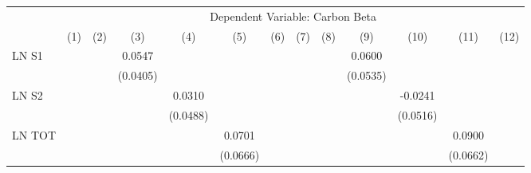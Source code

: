 {
\def\sym#1{\ifmmode^{#1}\else\(^{#1}\)\fi}
\begin{tabular}{l*{12}{c}}
\hline\hline
                    &\multicolumn{12}{c}{Dependent Variable: Carbon Beta}                                                                                                                                                                                                                   \\\cmidrule(lr){2-13}
                    &\multicolumn{1}{c}{(1)}         &\multicolumn{1}{c}{(2)}         &\multicolumn{1}{c}{(3)}         &\multicolumn{1}{c}{(4)}         &\multicolumn{1}{c}{(5)}         &\multicolumn{1}{c}{(6)}         &\multicolumn{1}{c}{(7)}         &\multicolumn{1}{c}{(8)}         &\multicolumn{1}{c}{(9)}         &\multicolumn{1}{c}{(10)}         &\multicolumn{1}{c}{(11)}         &\multicolumn{1}{c}{(12)}         \\
\hline
LN S1               &                     &                     &      0.0547         &                     &                     &                     &                     &                     &      0.0600         &                     &                     &                     \\
                    &                     &                     &    (0.0405)         &                     &                     &                     &                     &                     &    (0.0535)         &                     &                     &                     \\
LN S2               &                     &                     &                     &      0.0310         &                     &                     &                     &                     &                     &     -0.0241         &                     &                     \\
                    &                     &                     &                     &    (0.0488)         &                     &                     &                     &                     &                     &    (0.0516)         &                     &                     \\
LN TOT              &                     &                     &                     &                     &      0.0701         &                     &                     &                     &                     &                     &      0.0900         &                     \\
                    &                     &                     &                     &                     &    (0.0666)         &                     &                     &                     &                     &                     &    (0.0662)         &                     \\

\end{tabular}}
